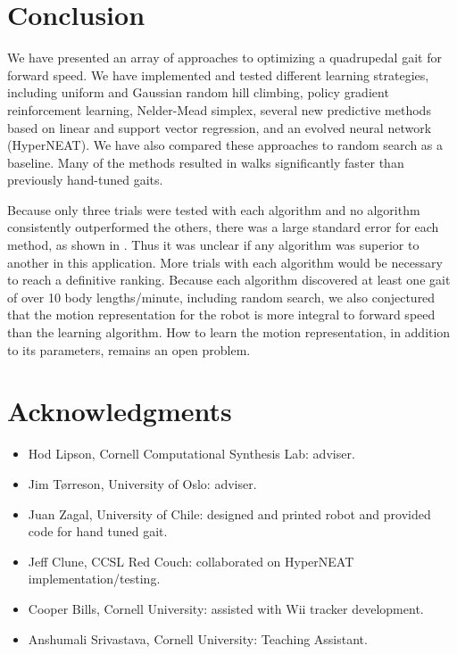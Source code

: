 \section{Conclusion}


We have presented an array of approaches to optimizing a quadrupedal
gait for forward speed.  We have implemented and tested different
learning strategies, including uniform and Gaussian random hill
climbing, policy gradient reinforcement learning, Nelder-Mead simplex,
several new predictive methods based on linear and support vector
regression, and an evolved neural network (HyperNEAT).  We have also
compared these approaches to random search as a baseline. Many of the
methods resulted in walks significantly faster than previously
hand-tuned gaits.

Because only three trials were tested with each algorithm and no
algorithm consistently outperformed the others, there was a large
standard error for each method, as shown in . Thus
it was unclear if any algorithm was superior to another in this
application. More trials with each algorithm would be necessary to
reach a definitive ranking. Because each algorithm discovered at least one gait of
over 10 body lengths/minute, including random search, we also
conjectured that the motion representation for the robot is more
integral to forward speed than the learning algorithm.  How to learn
the motion representation, in addition to its parameters, remains an
open problem.



\section{Acknowledgments}
\begin{itemize}
\item Hod Lipson, Cornell Computational Synthesis Lab: adviser.
\item Jim T\o rreson, University of Oslo: adviser.
\item Juan Zagal, University of Chile: designed and printed robot and provided code for hand tuned gait.
\item Jeff Clune, CCSL Red Couch: collaborated on HyperNEAT implementation/testing.
\item Cooper Bills, Cornell University: assisted with Wii tracker development.
\item Anshumali Srivastava, Cornell University: Teaching Assistant.
\end{itemize}

